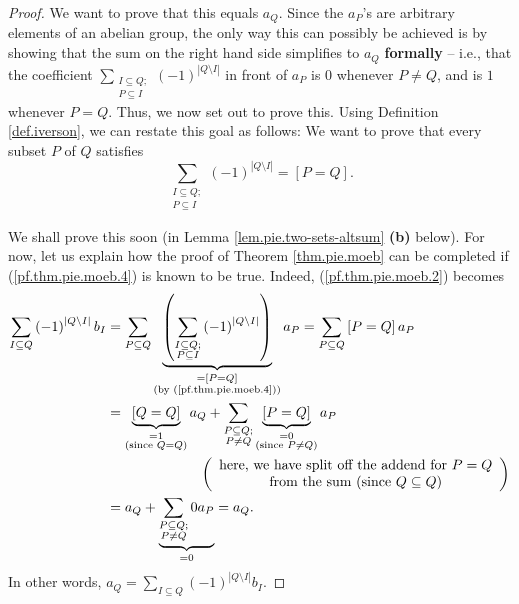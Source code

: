\begin{proof}
We want to prove that this equals $a_{Q}$. Since the $a_{P}$'s are arbitrary
elements of an abelian group, the only way this can possibly be achieved is by
showing that the sum on the right hand side simplifies to $a_{Q}$
\textbf{formally} -- i.e., that the coefficient $\sum_{\substack{I\subseteq
Q;\\P\subseteq I}}\left(  -1\right)  ^{\left\vert Q\setminus I\right\vert }$
in front of $a_{P}$ is $0$ whenever $P\neq Q$, and is $1$ whenever $P=Q$.
Thus, we now set out to prove this. Using Definition \ref{def.iverson}, we can
restate this goal as follows: We want to prove that every subset $P$ of $Q$
satisfies%
\begin{equation}
\sum_{\substack{I\subseteq Q;\\P\subseteq I}}\left(  -1\right)  ^{\left\vert
Q\setminus I\right\vert }=\left[  P=Q\right]  . \label{pf.thm.pie.moeb.4}%
\end{equation}


We shall prove this soon (in Lemma \ref{lem.pie.two-sets-altsum} \textbf{(b)}
below). For now, let us explain how the proof of Theorem \ref{thm.pie.moeb}
can be completed if (\ref{pf.thm.pie.moeb.4}) is known to be true. Indeed,
(\ref{pf.thm.pie.moeb.2}) becomes%
\begin{align*}
\sum_{I\subseteq Q}\left(  -1\right)  ^{\left\vert Q\setminus I\right\vert
}b_{I}  &  =\sum_{P\subseteq Q}\underbrace{\left(  \sum_{\substack{I\subseteq
Q;\\P\subseteq I}}\left(  -1\right)  ^{\left\vert Q\setminus I\right\vert
}\right)  }_{\substack{=\left[  P=Q\right]  \\\text{(by
(\ref{pf.thm.pie.moeb.4}))}}}a_{P}=\sum_{P\subseteq Q}\left[  P=Q\right]
a_{P}\\
&  =\underbrace{\left[  Q=Q\right]  }_{\substack{=1\\\text{(since }%
Q=Q\text{)}}}a_{Q}+\sum_{\substack{P\subseteq Q;\\P\neq Q}}\underbrace{\left[
P=Q\right]  }_{\substack{=0\\\text{(since }P\neq Q\text{)}}}a_{P}\\
&  \ \ \ \ \ \ \ \ \ \ \ \ \ \ \ \ \ \ \ \ \left(
\begin{array}
[c]{c}%
\text{here, we have split off the addend for }P=Q\\
\text{from the sum (since }Q\subseteq Q\text{)}%
\end{array}
\right) \\
&  =a_{Q}+\underbrace{\sum_{\substack{P\subseteq Q;\\P\neq Q}}0a_{P}}%
_{=0}=a_{Q}.
\end{align*}
In other words, $a_{Q}=\sum_{I\subseteq Q}\left(  -1\right)  ^{\left\vert
Q\setminus I\right\vert }b_{I}$.


\end{proof}
